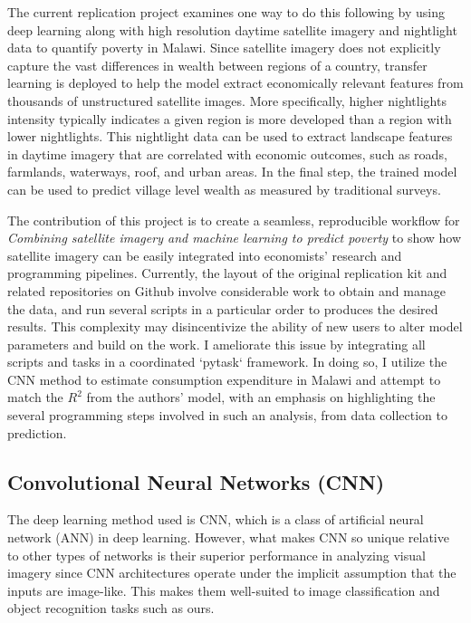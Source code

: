 \documentclass[11pt, a4paper, leqno]{article}
\begin{document}
The current replication project examines one way to do this following \citet{jean2016combining} by using deep learning along with high resolution daytime satellite imagery and nightlight data to quantify poverty in Malawi. Since satellite imagery does not explicitly capture the vast differences in wealth between regions of a country, transfer learning is deployed to help the model extract economically relevant features from thousands of unstructured satellite images. More specifically, higher nightlights intensity typically indicates a given region is more developed than a region with lower nightlights. This nightlight data can be used to extract landscape features in daytime imagery that are correlated with economic outcomes, such as roads, farmlands, waterways, roof, and urban areas. In the final step, the trained model can be used to predict village level wealth as measured by traditional surveys. 

The contribution of this project is to create a seamless, reproducible workflow for \textit{Combining satellite imagery and machine learning to predict poverty} \citep{jean2016combining} to show how satellite imagery can be easily integrated into economists' research and programming pipelines. Currently, the layout of the original replication kit and related repositories on Github involve considerable work to obtain and manage the data, and run several scripts in a particular order to produces the desired results. This complexity may disincentivize the ability of new users to alter model parameters and build on the work. I ameliorate this issue by integrating all scripts and tasks in a coordinated `pytask` framework. In doing so, I utilize the CNN method to estimate consumption expenditure in Malawi and attempt to match the $R^2$ from the authors' model, with an emphasis on highlighting the several programming steps involved in such an analysis, from data collection to prediction. 

\subsection{Convolutional Neural Networks (CNN)}

The deep learning method used is CNN, which is a class of artificial neural network (ANN) in deep learning. However, what makes CNN so unique relative to other types of networks is their superior performance in analyzing visual imagery since CNN architectures operate under the implicit assumption that the inputs are image-like. This makes them well-suited to image classification and object recognition tasks such as ours.
\end{document}
